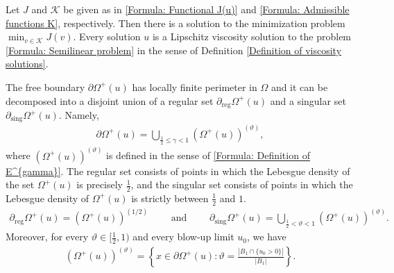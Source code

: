 \documentclass[11pt,reqno]{amsart}
\begin{document}
\begin{theorem}\label{Theorem: Main theorem1}
	Let $J$ and $\mathcal{K}$ be given as in \eqref{Formula: Functional J(u)} and \eqref{Formula: Admissible functions K}, respectively. Then there is a solution to the minimization problem $\min_{v\in\mathcal{K}}J(v)$. Every solution $u$ is a Lipschitz viscosity solution to the problem \eqref{Formula: Semilinear problem} in the sense of Definition \ref{Definition of viscosity solutions}.
	
	The free boundary $\partial\varOmega^{+}(u)$ has locally finite perimeter in $\Omega$ and it can be decomposed into a disjoint union of a regular set $\partial_{\mathrm{reg}}\varOmega^{+}(u)$ and a singular set $\partial_{\mathrm{sing}}\varOmega^{+}(u)$. Namely,   
	\begin{align*}
		\partial\varOmega^{+}(u)=\bigcup_{\tfrac{1}{2}\leqslant\gamma<1}(\varOmega^{+}(u))^{(\vartheta)},
	\end{align*}
    where $(\varOmega^{+}(u))^{(\vartheta)}$ is defined in the sense of \eqref{Formula: Definition of E^{gamma}}. The regular set consists of points in which the Lebesgue density of the set $\varOmega^{+}(u)$ is precisely $\tfrac{1}{2}$, and the singular set consists of points in which the Lebesgue density of $\varOmega^{+}(u)$ is strictly between $\tfrac{1}{2}$ and $1$.
	\begin{align*}
		\partial_{\mathrm{reg}}\varOmega^{+}(u)=\left(\varOmega^{+}(u)\right)^{(1/2)}\qquad\text{ and }\qquad\partial_{\mathrm{sing}}\varOmega^{+}(u)=\bigcup_{\tfrac{1}{2}<\vartheta<1}\left(\varOmega^{+}(u)\right)^{(\vartheta)}.
	\end{align*}	
    Moreover, for every $\vartheta\in[\tfrac{1}{2},1)$ and every blow-up limit $u_{0}$, we have
    \begin{align*}
    	(\varOmega^{+}(u))^{(\vartheta)}=\left\lbrace x\in\partial\varOmega^{+}(u)\colon\vartheta=\frac{|B_{1}\cap\{u_{0}>0\}|}{|B_{1}|}\right\rbrace.
    \end{align*}
\end{theorem}
\end{document}
